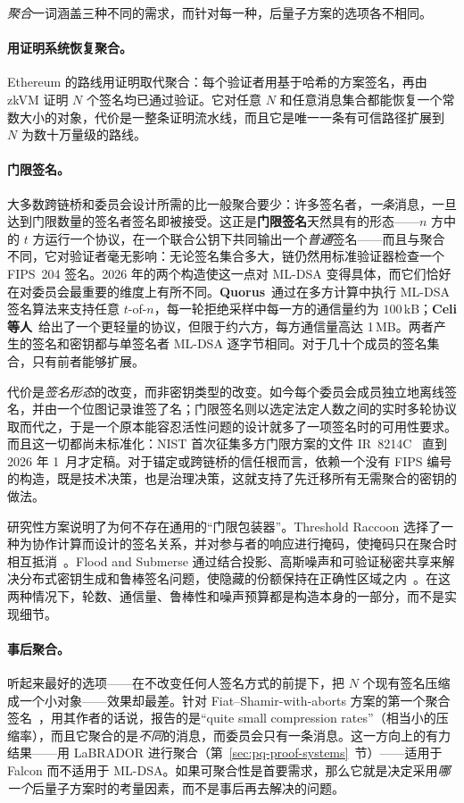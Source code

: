 \emph{聚合}一词涵盖三种不同的需求，而针对每一种，后量子方案的选项各不相同。

\paragraph{用证明系统恢复聚合。}
Ethereum 的路线用证明取代聚合：每个验证者用基于哈希的方案签名，再由 zkVM 证明 $N$ 个签名均已通过验证。它对任意 $N$ 和任意消息集合都能恢复一个常数大小的对象，代价是一整条证明流水线，而且它是唯一一条有可信路径扩展到 $N$ 为数十万量级的路线。

\paragraph{门限签名。}
大多数跨链桥和委员会设计所需的比一般聚合要少：许多签名者，\emph{一条}消息，一旦达到门限数量的签名者签名即被接受。这正是\textbf{门限签名}天然具有的形态——$n$ 方中的 $t$ 方运行一个协议，在一个联合公钥下共同输出一个\emph{普通}签名——而且与聚合不同，它对验证者毫无影响：无论签名集合多大，链仍然用标准验证器检查一个 FIPS~204 签名。2026 年的两个构造使这一点对 ML-DSA 变得具体，而它们恰好在对委员会最重要的维度上有所不同。\textbf{Quorus}~\cite{quorus2025}通过在多方计算中执行 ML-DSA 签名算法来支持任意 $t$-of-$n$，每一轮拒绝采样中每一方的通信量约为 $100$\,kB；\textbf{Celi 等人}~\cite{thresholdmldsa2026}给出了一个更轻量的协议，但限于约六方，每方通信量高达 1\,MB。两者产生的签名和密钥都与单签名者 ML-DSA 逐字节相同。对于几十个成员的签名集合，只有前者能够扩展。

代价是\emph{签名形态}的改变，而非密钥类型的改变。如今每个委员会成员独立地离线签名，并由一个位图记录谁签了名；门限签名则以选定法定人数之间的实时多轮协议取而代之，于是一个原本能容忍活性问题的设计就多了一项签名时的可用性要求。而且这一切都尚未标准化：NIST 首次征集多方门限方案的文件 IR~8214C~\cite{nistthreshold} 直到 2026 年 1~月才定稿。对于锚定或跨链桥的信任根而言，依赖一个没有 FIPS 编号的构造，既是技术决策，也是治理决策，这就支持了先迁移所有无需聚合的密钥的做法。

研究性方案说明了为何不存在通用的“门限包装器”。Threshold Raccoon 选择了一种为协作计算而设计的签名关系，并对参与者的响应进行掩码，使掩码只在聚合时相互抵消~\cite{thresholdraccoon2024}。Flood and Submerse 通过结合投影、高斯噪声和可验证秘密共享来解决分布式密钥生成和鲁棒签名问题，使隐藏的份额保持在正确性区域之内~\cite{floodsubmerse2024}。在这两种情况下，轮数、通信量、鲁棒性和噪声预算都是构造本身的一部分，而不是实现细节。

\paragraph{事后聚合。}
听起来最好的选项——在不改变任何人签名方式的前提下，把 $N$ 个现有签名压缩成一个小对象——效果却最差。针对 Fiat--Shamir-with-aborts 方案的第一个聚合签名~\cite{boudgousttakahashi2023}，用其作者的话说，报告的是“quite small compression rates”（相当小的压缩率），而且它聚合的是\emph{不同}的消息，而委员会只有一条消息。这一方向上的有力结果——用 LaBRADOR 进行聚合（第~\ref{sec:pq-proof-systems}~节）——适用于 Falcon 而不适用于 ML-DSA。如果可聚合性是首要需求，那么它就是决定采用\emph{哪一个}后量子方案时的考量因素，而不是事后再去解决的问题。

